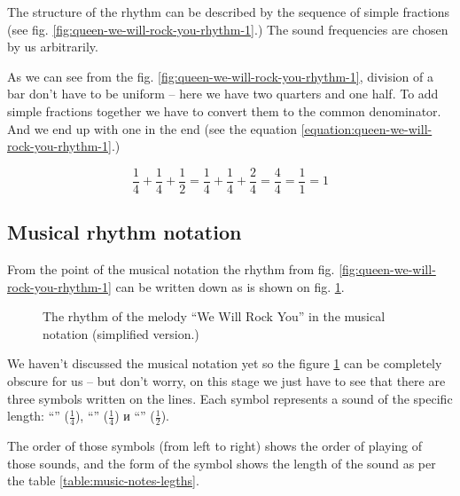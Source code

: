 \documentclass[../sparc.tex]{subfiles}
\begin{document}
The structure of the rhythm can be described by the sequence of simple fractions
(see fig. \ref{fig:queen-we-will-rock-you-rhythm-1}.)  The sound frequencies are
chosen by us arbitrarily.

As we can see from the fig. \ref{fig:queen-we-will-rock-you-rhythm-1}, division
of a bar don't have to be uniform -- here we have two quarters and one half.  To
add simple fractions together we have to convert them to the common denominator.
And we end up with one in the end (see the equation
\ref{equation:queen-we-will-rock-you-rhythm-1}.)

\begin{equation}
  \frac{1}{4} + \frac{1}{4} + \frac{1}{2} = \frac{1}{4} + \frac{1}{4} + \frac{2}{4} = \frac{4}{4} = \frac{1}{1} = 1
  \label{equation:queen-we-will-rock-you-rhythm-1}
\end{equation}

\subsection{Musical rhythm notation}

From the point of the musical notation the rhythm from
fig. \ref{fig:queen-we-will-rock-you-rhythm-1} can be written down as is shown
on fig. \ref{fig:lilypond-queen-1}.

\begin{figure}[ht]
  \centering
  \caption{The rhythm of the melody ``We Will Rock You'' in the musical notation
    (simplified version.)}
  \label{fig:lilypond-queen-1}
\end{figure}

We haven't discussed the musical notation yet so the figure
\ref{fig:lilypond-queen-1} can be completely obscure for us -- but don't worry,
on this stage we just have to see that there are three symbols written on the
lines.  Each symbol represents a sound of the specific length: ``\quarterNote''
($\frac{1}{4}$), ``\quarterNote'' ($\frac{1}{4}$) и ``\halfNote''
($\frac{1}{2}$).

The order of those symbols (from left to right) shows the order of playing of
those sounds, and the form of the symbol shows the length of the sound as per
the table \ref{table:music-notes-legths}.
\end{document}
